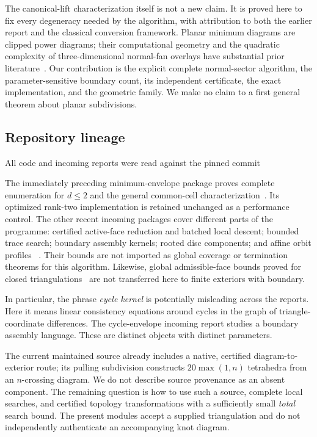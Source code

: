 The canonical-lift characterization itself is not a new claim.
It is proved here to fix every degeneracy needed by the algorithm,
with attribution to both the earlier report and the classical
conversion framework.  Planar minimum diagrams are clipped power
diagrams; their computational geometry and the quadratic complexity of
three-dimensional normal-fan overlays have substantial prior
literature~\cite{Aurenhammer1987,Weibel2010,Fogel2009}.
Our contribution is the explicit complete normal-sector algorithm,
the parameter-sensitive boundary count, its independent certificate,
the exact implementation, and the geometric family.  We make no claim
to a first general theorem about planar subdivisions.

\subsection{Repository lineage}

All code and incoming reports were read against the pinned commit
\begin{center}\small\ttfamily\basecommit\end{center}
The immediately preceding minimum-envelope
package proves complete enumeration for \(d\le2\) and the general
common-cell characterization~\cite{MinimumEnvelopes}.  Its optimized
rank-two implementation is retained unchanged as a performance
control.  The other recent incoming packages cover different parts
of the programme: certified active-face reduction and batched local
descent; bounded trace search; boundary assembly kernels; rooted disc
components; and affine orbit profiles
~\cite{ActiveFaces,TraceSearch,CycleKernels,RootedDiscs,AffineProfiles}.
Their bounds are not imported as global coverage or termination
theorems for this algorithm.
Likewise, global admissible-face bounds proved for closed
triangulations~\cite{Burton2011} are not transferred here to
finite exteriors with boundary.

In particular, the phrase \emph{cycle kernel} is potentially misleading
across the reports.  Here it means linear consistency equations around
cycles in the graph of triangle-coordinate differences.  The
cycle-envelope incoming report studies a boundary assembly language.
These are distinct objects with distinct parameters.

The current maintained source already includes a native, certified
diagram-to-exterior route; its pulling subdivision constructs
\(20\max(1,n)\) tetrahedra from an \(n\)-crossing diagram.  We do not
describe source provenance as an absent component.  The remaining
question is how to use such a source, complete local searches, and
certified topology transformations with a sufficiently small
\emph{total} search bound.  The present modules accept a supplied
triangulation and do not independently authenticate an accompanying
knot diagram.


